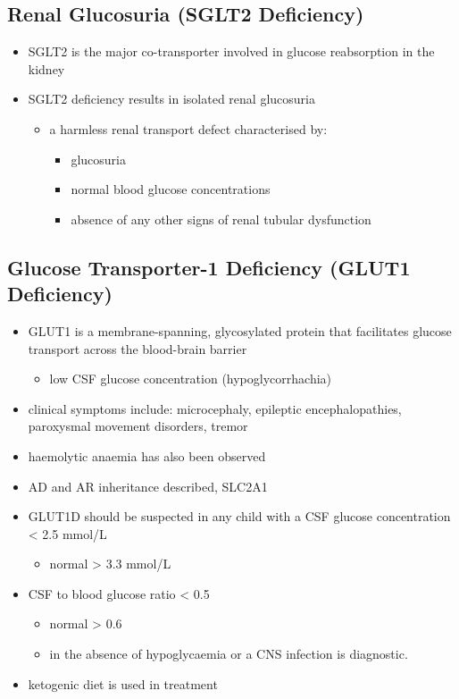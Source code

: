 \documentclass{scrartcl}
\begin{document}
\subsection{Renal Glucosuria (SGLT2 Deficiency)}
\label{sec:orgdec2bf0}
\begin{itemize}
\item SGLT2 is the major co-transporter involved in glucose reabsorption in
the kidney
\item SGLT2 deficiency results in isolated renal glucosuria
\begin{itemize}
\item a harmless renal transport defect characterised by:
\begin{itemize}
\item glucosuria
\item normal blood glucose concentrations
\item absence of any other signs of renal tubular dysfunction
\end{itemize}
\end{itemize}
\end{itemize}

\subsection{Glucose Transporter-1 Deficiency (GLUT1 Deficiency)}
\label{sec:orgd041476}
\begin{itemize}
\item GLUT1 is a membrane-spanning, glycosylated protein that facilitates
glucose transport across the blood-brain barrier
\begin{itemize}
\item low CSF glucose concentration (hypoglycorrhachia)
\end{itemize}

\item clinical symptoms include: microcephaly, epileptic encephalopathies,
paroxysmal movement disorders, tremor
\item haemolytic anaemia has also been observed

\item AD and AR inheritance described, SLC2A1

\item GLUT1D should be suspected in any child with a CSF glucose
concentration \textless{} 2.5 mmol/L 
\begin{itemize}
\item normal \textgreater{} 3.3 mmol/L
\end{itemize}

\item CSF to blood glucose ratio \textless{} 0.5 
\begin{itemize}
\item normal \textgreater{} 0.6
\item in the absence of hypoglycaemia or a CNS infection is diagnostic.
\end{itemize}
\item ketogenic diet is used in treatment
\end{itemize}
\end{document}

